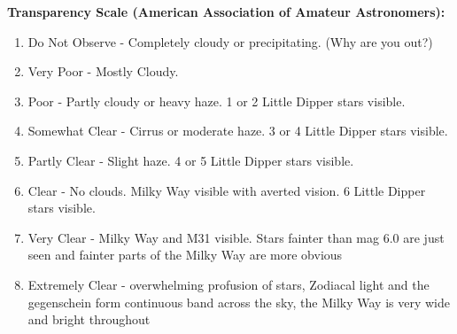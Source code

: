 \documentclass[10pt,twoside,a4paper]{article}
\begin{document}
\bigskip      
{\bf Transparency Scale (American Association of Amateur Astronomers):} 
\begin{enumerate} 
\item Do Not Observe - Completely cloudy or precipitating. (Why are you out?) 
\item Very Poor - Mostly Cloudy.  
\item Poor - Partly cloudy or heavy haze. 1 or 2 Little Dipper stars visible.  
\item Somewhat Clear - Cirrus or moderate haze. 3 or 4 Little Dipper stars visible.  
\item Partly Clear - Slight haze. 4 or 5 Little Dipper stars visible.  
\item Clear - No clouds. Milky Way visible with averted vision. 6 Little Dipper stars visible.  
\item Very Clear - Milky Way and M31 visible. Stars fainter than mag 6.0 are just seen and fainter parts of the Milky Way are more obvious  
\item Extremely Clear - overwhelming profusion of stars, Zodiacal light and the gegenschein form continuous band across the sky, the Milky Way is very wide and bright throughout 
\end{enumerate} 
\newpage 
 


















 
\end{document}
